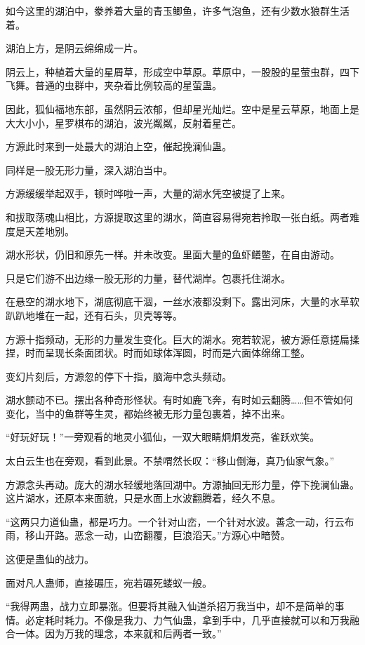 \begin{this_body}
如今这里的湖泊中，豢养着大量的青玉鲫鱼，许多气泡鱼，还有少数水狼群生活着。

湖泊上方，是阴云绵绵成一片。

阴云上，种植着大量的星屑草，形成空中草原。草原中，一股股的星萤虫群，四下飞舞。普通的虫群中，夹杂着比例较高的星萤蛊。

因此，狐仙福地东部，虽然阴云浓郁，但却星光灿烂。空中是星云草原，地面上是大大小小，星罗棋布的湖泊，波光粼粼，反射着星芒。

方源此时来到一处最大的湖泊上空，催起挽澜仙蛊。

同样是一股无形力量，深入湖泊当中。

方源缓缓举起双手，顿时哗啦一声，大量的湖水凭空被提了上来。

和拔取荡魂山相比，方源提取这里的湖水，简直容易得宛若拎取一张白纸。两者难度是天差地别。

湖水形状，仍旧和原先一样。并未改变。里面大量的鱼虾鳝鳖，在自由游动。

只是它们游不出边缘一股无形的力量，替代湖岸。包裹托住湖水。

在悬空的湖水地下，湖底彻底干涸，一丝水液都没剩下。露出河床，大量的水草软趴趴地堆在一起，还有石头，贝壳等等。

方源十指频动，无形的力量发生变化。巨大的湖水。宛若软泥，被方源任意搓扁揉捏，时而呈现长条面团状。时而如球体浑圆，时而是六面体绵绵工整。

变幻片刻后，方源忽的停下十指，脑海中念头频动。

湖水颤动不已。摆出各种奇形怪状。有时如鹿飞奔，有时如云翻腾……但不管如何变化，当中的鱼群等生灵，都始终被无形力量包裹着，掉不出来。

“好玩好玩！”一旁观看的地灵小狐仙，一双大眼睛炯炯发亮，雀跃欢笑。

太白云生也在旁观，看到此景。不禁喟然长叹：“移山倒海，真乃仙家气象。”

方源念头再动。庞大的湖水轻缓地落回湖中。方源抽回无形力量，停下挽澜仙蛊。这片湖水，还原本来面貌，只是水面上水波翻腾着，经久不息。

“这两只力道仙蛊，都是巧力。一个针对山峦，一个针对水波。善念一动，行云布雨，移山开路。恶念一动，山峦翻覆，巨浪滔天。”方源心中暗赞。

这便是蛊仙的战力。

面对凡人蛊师，直接碾压，宛若碾死蝼蚁一般。

“我得两蛊，战力立即暴涨。但要将其融入仙道杀招万我当中，却不是简单的事情。必定耗时耗力。不像是我力、力气仙蛊，拿到手中，几乎直接就可以和万我融合一体。因为万我的理念，本来就和后两者一致。”


\end{this_body}
